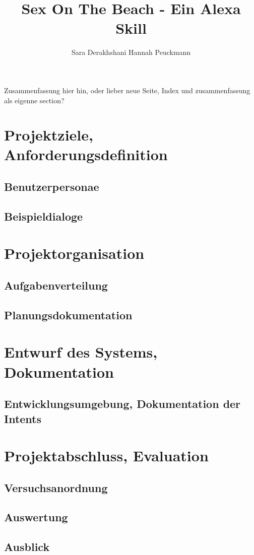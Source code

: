 \documentclass[12pt,letterpaper]{article}
\begin{document}
\title{Sex On The Beach - Ein Alexa Skill}
\author{Sara Derakhshani Hannah Peuckmann}
\maketitle
\thispagestyle{fancy}

Zusammenfassung hier hin, oder lieber neue Seite, Index und zusammenfassung als eigenne section?

\section{Projektziele, Anforderungsdefinition}
\subsection{Benutzerpersonae}
\subsection{Beispieldialoge}

\section{Projektorganisation}
\subsection{Aufgabenverteilung}
\subsection{Planungsdokumentation}

\section{Entwurf des Systems, Dokumentation}
\subsection{Entwicklungsumgebung, Dokumentation der Intents}

\section{Projektabschluss, Evaluation}
\subsection{Versuchsanordnung}
\subsection{Auswertung}
\subsection{Ausblick}
\end{document}
